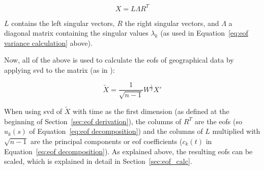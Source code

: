 \begin{equation}
  X = L \Lambda R^T 
  \label{eq:svd definition}
\end{equation}

$L$ contains the left singular vectors, $R$ the right singular vectors, and $\Lambda$ a diagonal matrix containing the singular values $\lambda_k$ (as used in Equation~\ref{eq:eof variance calculation} above). 

Now, all of the above is used to calculate the \acp{eof} of geographical data by applying \ac{svd} to the matrix (as in ): 

\begin{equation}
  \tilde{X} = \frac{1}{\sqrt{n - 1}} W^{\frac{1}{2}} X' 
  \label{eq:complete data preperation}
\end{equation}


When using \ac{svd} of $\tilde{X}$ with time as the first dimension (as defined at the beginning of Section~\ref{sec:eof derivation}), the columns of $R^T$ are the \acp{eof} (so $u_k(s)$ of Equation~\ref{eq:eof decomposition}) and the columns of $L$ multiplied with $\sqrt{n - 1}$ are the principal components or \ac{eof} coefficients ($c_k(t)$ in Equation~\ref{eq:eof decomposition}).
As explained above, the resulting \acp{eof} can be scaled, which is explained in detail in Section~\ref{sec:eof_calc}.






